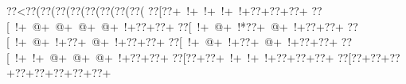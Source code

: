%
%
%
%
%
%
%
\def\goWhiteInk#1{\special{color push rgb 1 1 1} {#1} \special{color pop}}%
\def\goLap#1#2{\setbox0=\hbox{#1} \rlap{#1} \raise 2\goTextAdj\hbox to \wd0{\hss\eightpoint{#2}\hss}}%
\def\goLapWhite#1#2{\setbox0=\hbox{#1}\rlap{#1}\raise 2\goTextAdj\hbox to \wd0{\hss\eightpoint\goWhiteInk{#2}\hss}}%
\def\rc#1{\raise \goTextAdj\hbox to \goIntWd{\kern \goTextAdj\hss\rm#1\hss}}%
\def\bc#1{\hbox to \goIntWd{\hss#1\hss}}%
\lineskip=0pt
\parindent=0pt
\nopagenumbers
\raggedbottom        %



\vbox{\vbox{\goo
\hbox{\0??<\0??(\0??(\0??(\0??(\0??(\0??(\0??(\0??(}
\hbox{\0??[\0??+\- !+\- !+\- !+\- !+\0??+\0??+\0??+}
\hbox{\0??[\- !+\- @+\- @+\- @+\- @+\- !+\0??+\0??+}
\hbox{\0??[\- !+\- @+\- !*\0??+\- @+\- !+\0??+\0??+}
\hbox{\0??[\- !+\- @+\- !+\0??+\- @+\- !+\0??+\0??+}
\hbox{\0??[\- !+\- @+\- !+\0??+\- @+\- !+\0??+\0??+}
\hbox{\0??[\- !+\- !+\- @+\- @+\- @+\- !+\0??+\0??+}
\hbox{\0??[\0??+\0??+\- !+\- !+\- !+\0??+\0??+\0??+}
\hbox{\0??[\0??+\0??+\0??+\0??+\0??+\0??+\0??+\0??+}
\smallskip
}
}
\hfil\break


